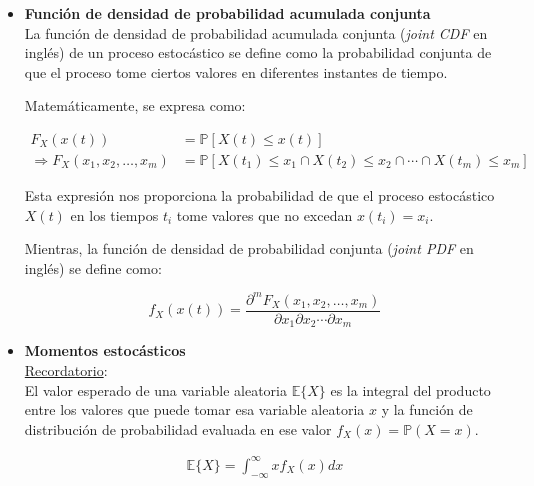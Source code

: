 \begin{itemize}
    \item \textbf{Función de densidad de probabilidad acumulada conjunta}\\
    
    La función de densidad de probabilidad acumulada conjunta (\emph{joint CDF} en inglés) de un proceso estocástico se define como la probabilidad conjunta de que el proceso tome ciertos valores en diferentes instantes de tiempo. 
    
    Matemáticamente, se expresa como:
    
    \begin{align*}
         F_{X}({x(t)}) &= \mathbb{P}[X(t) \leq {x(t)}]\\
        \Longrightarrow F_{X}(x_1,x_2,\ldots,x_m) &= \mathbb{P} \left[ X(t_1)\leq x_1 \cap X(t_2) \leq x_2 \cap \cdots \cap X(t_m) \leq x_m \right]
    \end{align*}    
    
    
    
    Esta expresión nos proporciona la probabilidad de que el proceso estocástico $X(t)$ en los tiempos $t_i$ tome valores que no excedan $x(t_i)=x_i$.

    Mientras, la función de densidad de probabilidad conjunta (\emph{joint PDF} en inglés) se define como:

    \begin{equation*}
         f_{X}({x(t)}) = \frac{\partial^m F_X(x_1,x_2,\ldots,x_m)}{\partial x_1 \partial x_2 \cdots \partial x_m} 
    \end{equation*}
    
    \item \textbf{Momentos estocásticos}\\ 
    \underline{Recordatorio}: \\
    El valor esperado de una variable aleatoria $\mathbb{E}\{X\}$ es la integral del producto entre los valores que puede tomar esa variable aleatoria $x$ y la función de distribución de probabilidad evaluada en ese valor $f_X(x) = \mathbb{P}(X=x)$.
    
    \begin{align*}
        \mathbb{E}\{X\} = \int_{-\infty}^{\infty} x f_X(x) dx
    \end{align*}
    

\end{itemize}
